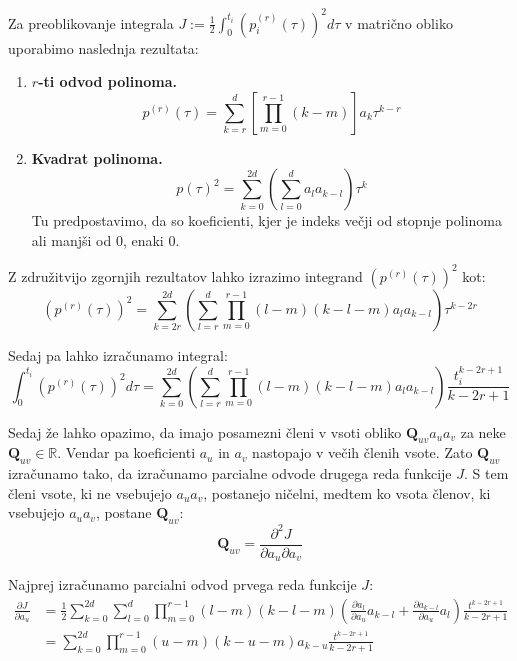 \documentclass[isrm2, tisk]{fmfdelo}
\newcommand{\qmat}{\mathbf{Q}}
\begin{document}
Za preoblikovanje integrala $J := \frac{1}{2}\int_0^{t_i} (p_i^{(r)}(\tau))^2 d\tau$ v matrično obliko uporabimo naslednja rezultata:
\begin{enumerate}
    \item \textbf{$r$-ti odvod polinoma.}
\begin{equation}
    p^{(r)}(\tau) = \sum_{k=r}^{d} \left[\prod_{m=0}^{r-1} (k-m)\right]a_{k} \tau^{k-r}
\end{equation}
    \item \textbf{Kvadrat polinoma.}
    \begin{equation}
        p(\tau)^2 = \sum_{k=0}^{2d} \left( \sum_{l=0}^{d} a_l a_{k-l} \right) \tau^k
    \end{equation}
    Tu predpostavimo, da so koeficienti, kjer je indeks večji od stopnje polinoma ali manjši od 0, enaki 0.
\end{enumerate}

Z združitvijo zgornjih rezultatov lahko izrazimo integrand $(p^{(r)}(\tau))^2$ kot:
\begin{equation}
    (p^{(r)}(\tau))^2 = \sum_{k=2r}^{2d} \left( \sum_{l=r}^{d} \prod_{m=0}^{r-1} (l-m)(k-l-m) a_l a_{k-l} \right) \tau^{k-2r}
\end{equation}

Sedaj pa lahko izračunamo integral:
\begin{equation}
    \int_0^{t_i} (p^{(r)}(\tau))^2 d\tau = \sum_{k=0}^{2d} \left( \sum_{l=r}^{d} \prod_{m=0}^{r-1} (l-m)(k-l-m) a_l a_{k-l} \right) \frac{t_i^{k-2r+1}}{k-2r+1}
\end{equation}

Sedaj že lahko opazimo, da imajo posamezni členi v vsoti obliko $\qmat_{uv} a_u a_v$ za neke $\qmat_{uv} \in \mathbb{R}$. Vendar pa koeficienti $a_u$ in $a_v$ nastopajo v večih členih vsote. Zato $\qmat_{uv}$ izračunamo tako, da izračunamo parcialne odvode drugega reda funkcije $J$. S tem členi vsote, ki ne vsebujejo $a_u a_v$, postanejo ničelni, medtem ko vsota členov, ki vsebujejo $a_u a_v$, postane $\qmat_{uv}$:
\begin{equation}
    \qmat_{uv} = \frac{\partial^2 J}{\partial a_u \partial a_v}
\end{equation}

Najprej izračunamo parcialni odvod prvega reda funkcije $J$:
\begin{equation}
    \begin{aligned}
    \frac{\partial J}{\partial a_u} &= \frac{1}{2}\sum_{k=0}^{2d} \sum_{l=0}^{d} \prod_{m=0}^{r-1} (l-m)(k-l-m) \left(\frac{\partial a_l}{\partial a_u} a_{k-l} + \frac{\partial a_{k-l}}{\partial a_u} a_l \right) \frac{t^{k-2r+1}}{k-2r+1}\\
    &= \sum_{k=0}^{2d} \prod_{m=0}^{r-1} (u-m)(k-u-m) a_{k-u} \frac{t^{k-2r+1}}{k-2r+1}
\end{aligned}
\end{equation}
\end{document}
